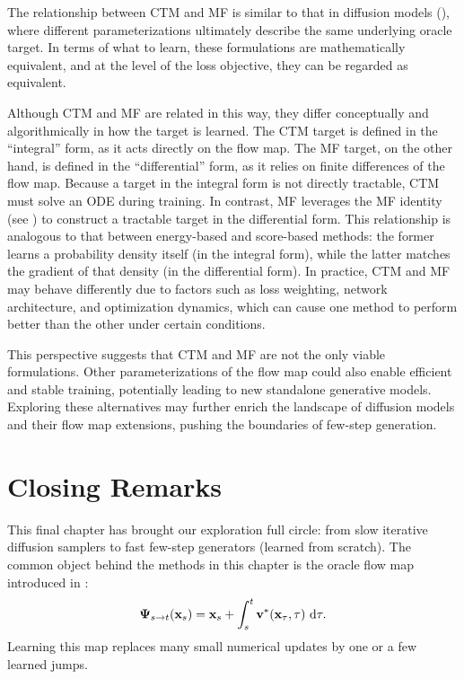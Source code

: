 The relationship between CTM and MF is similar to that in diffusion models (), where different parameterizations ultimately describe the same underlying oracle target. In terms of what to learn, these formulations are mathematically equivalent, and at the level of the loss objective, they can be regarded as equivalent.

Although CTM and MF are related in this way, they differ conceptually and algorithmically in how the target is learned. The CTM target is defined in the ``integral'' form, as it acts directly on the flow map. The MF target, on the other hand, is defined in the ``differential'' form, as it relies on finite differences of the flow map. Because a target in the integral form is not directly tractable, CTM must solve an ODE during training. In contrast, MF leverages the MF identity (see ) to construct a tractable target in the differential form. This relationship is analogous to that between energy-based and score-based methods: the former learns a probability density itself (in the integral form), while the latter matches the gradient of that density (in the differential form). In practice, CTM and MF may behave differently due to factors such as loss weighting, network architecture, and optimization dynamics, which can cause one method to perform better than the other under certain conditions.

This perspective suggests that CTM and MF are not the only viable formulations. Other parameterizations of the flow map could also enable efficient and stable training, potentially leading to new standalone generative models. Exploring these alternatives may further enrich the landscape of diffusion models and their flow map extensions, pushing the boundaries of few-step generation.

\newpage

\section{Closing Remarks}\label{sec:ch11_cr}

This final chapter has brought our exploration full circle: from slow iterative
diffusion samplers to fast few-step generators (learned from scratch). The common object behind the methods in this chapter is the oracle flow map
introduced in :
\[
{\bm{\Psi}}_{s\to t}({\mathbf{x}}_s)
=
{\mathbf{x}}_s+\int_s^t {\mathbf{v}}^*({\mathbf{x}}_\tau,\tau)\,\mathop{}\!\mathrm{d} \tau.
\]
Learning this map replaces many small numerical updates by one or a few learned
jumps.

